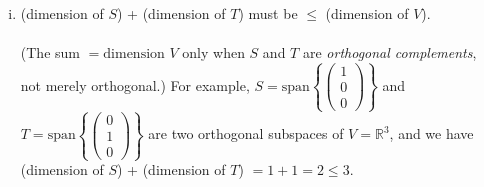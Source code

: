 \documentclass[12pt]{article}
\begin{document}
\begin{enumerate}[1.]
\begin{enumerate}[(a)]
\begin{enumerate}[(i)]
            \item (dimension of $S$) + (dimension of $T$) must be $\boxed{\leq}$ (dimension of $V$).\\
            \\
            (The sum $= \mbox{dimension }V$ only when $S$ and $T$ are \emph{orthogonal complements}, not merely orthogonal.)
            For example, $S = \text{span}\left\{\begin{pmatrix}
            1\\0\\0
            \end{pmatrix}\right\}$ and $T = \text{span}\left\{\begin{pmatrix}
            0\\1\\0
            \end{pmatrix}\right\}$ are two orthogonal subspaces of $V = \mathbb{R}^3$, and we have (dimension of $S$) + (dimension of $T$) $= 1+1 = 2 \leq 3$.
            
        \end{enumerate}
        

\end{enumerate}
\end{enumerate}
\end{document}
